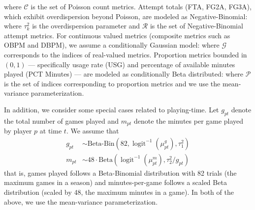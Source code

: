 \documentclass[aoas]{imsart}
\begin{document}
where $\mathcal{C}$ is the set of Poisson count metrics. Attempt totals (FTA, FG2A, FG3A), which exhibit overdispersion beyond Poisson, are modeled as Negative-Binomial:
where $\tau^2_k$ is the overdispersion parameter and $\mathcal{R}$ is the set of Negative-Binomial attempt metrics. For continuous valued metrics (composite metrics such as OBPM and DBPM), we assume a conditionally Gaussian model:
where $\mathcal{G}$ corresponds to the indices of real-valued metrics. Proportion metrics bounded in $(0,1)$ — specifically usage rate (USG) and percentage of available minutes played (PCT Minutes) — are modeled as conditionally Beta distributed:
where $\mathcal{P}$ is the set of indices corresponding to proportion metrics and we use the mean-variance parameterization.

In addition, we consider some special cases related to playing-time.  Let $g_{pt}$ denote the total number of games played and $m_{pt}$ denote the minutes per game played by player $p$ at time $t$.  We assume that
\begin{align}
g_{pt} &\sim \text{Beta-Bin}(82, \operatorname{logit}^{-1}(\mu^g_{pt}), \tau_1^2)\\
m_{pt} &\sim 48\cdot \text{Beta}(\operatorname{logit}^{-1}(\mu^m_{pt}), \tau_2^2 /g_{pt})
\end{align}
that is, games played follows a Beta-Binomial distribution with 82 trials (the maximum games in a season) and minutes-per-game follows a scaled Beta distribution (scaled by 48, the maximum minutes in a game).  In both of the above, we use the mean-variance parameterization.  

\end{document}
